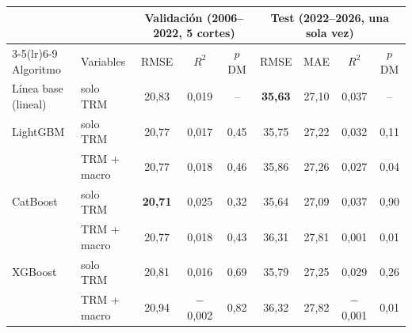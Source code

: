 \begin{tabular}{llccc|cccc}
\toprule
 & & \multicolumn{3}{c|}{Validación (2006--2022, 5 cortes)} & \multicolumn{4}{c}{Test (2022--2026, una sola vez)} \\
\cmidrule(lr){3-5}\cmidrule(lr){6-9}
Algoritmo & Variables & RMSE & $R^2$ & $p$ DM & RMSE & MAE & $R^2$ & $p$ DM \\
\midrule
Línea base (lineal) & solo TRM & 20,83 & 0,019 & -- & \textbf{35,63} & 27,10 & 0,037 & -- \\
\addlinespace[2pt]
LightGBM & solo TRM & 20,77 & 0,017 & 0,45 & 35,75 & 27,22 & 0,032 & 0,11 \\
 & TRM + macro & 20,77 & 0,018 & 0,46 & 35,86 & 27,26 & 0,027 & 0,04 \\
\addlinespace[2pt]
CatBoost & solo TRM & \textbf{20,71} & 0,025 & 0,32 & 35,64 & 27,09 & 0,037 & 0,90 \\
 & TRM + macro & 20,77 & 0,018 & 0,43 & 36,31 & 27,81 & 0,001 & 0,01 \\
\addlinespace[2pt]
XGBoost & solo TRM & 20,81 & 0,016 & 0,69 & 35,79 & 27,25 & 0,029 & 0,26 \\
 & TRM + macro & 20,94 & $-$0,002 & 0,82 & 36,32 & 27,82 & $-$0,001 & 0,01 \\
\bottomrule
\end{tabular}

